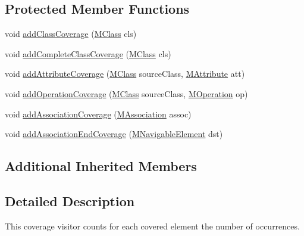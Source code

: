 \subsection*{Protected Member Functions}
\begin{DoxyCompactItemize}
\item 
void \hyperlink{classorg_1_1tzi_1_1use_1_1analysis_1_1coverage_1_1_coverage_calculation_visitor_a76f1d26a8a613f7fad1c69e1c1c86075}{add\-Class\-Coverage} (\hyperlink{interfaceorg_1_1tzi_1_1use_1_1uml_1_1mm_1_1_m_class}{M\-Class} cls)
\item 
void \hyperlink{classorg_1_1tzi_1_1use_1_1analysis_1_1coverage_1_1_coverage_calculation_visitor_a2efd9074033f1efc45ada5f5f00e0fdf}{add\-Complete\-Class\-Coverage} (\hyperlink{interfaceorg_1_1tzi_1_1use_1_1uml_1_1mm_1_1_m_class}{M\-Class} cls)
\item 
void \hyperlink{classorg_1_1tzi_1_1use_1_1analysis_1_1coverage_1_1_coverage_calculation_visitor_aadd4c7269e43524697aec5bedfe91446}{add\-Attribute\-Coverage} (\hyperlink{interfaceorg_1_1tzi_1_1use_1_1uml_1_1mm_1_1_m_class}{M\-Class} source\-Class, \hyperlink{classorg_1_1tzi_1_1use_1_1uml_1_1mm_1_1_m_attribute}{M\-Attribute} att)
\item 
void \hyperlink{classorg_1_1tzi_1_1use_1_1analysis_1_1coverage_1_1_coverage_calculation_visitor_a5e9acf507fc7799c3b76b6c157a69023}{add\-Operation\-Coverage} (\hyperlink{interfaceorg_1_1tzi_1_1use_1_1uml_1_1mm_1_1_m_class}{M\-Class} source\-Class, \hyperlink{classorg_1_1tzi_1_1use_1_1uml_1_1mm_1_1_m_operation}{M\-Operation} op)
\item 
void \hyperlink{classorg_1_1tzi_1_1use_1_1analysis_1_1coverage_1_1_coverage_calculation_visitor_a10ab9cd8204f625936aa09c8072b3408}{add\-Association\-Coverage} (\hyperlink{interfaceorg_1_1tzi_1_1use_1_1uml_1_1mm_1_1_m_association}{M\-Association} assoc)
\item 
void \hyperlink{classorg_1_1tzi_1_1use_1_1analysis_1_1coverage_1_1_coverage_calculation_visitor_addacbc361607ba01c4bff2a8eaed232f}{add\-Association\-End\-Coverage} (\hyperlink{interfaceorg_1_1tzi_1_1use_1_1uml_1_1mm_1_1_m_navigable_element}{M\-Navigable\-Element} dst)
\end{DoxyCompactItemize}
\subsection*{Additional Inherited Members}


\subsection{Detailed Description}
This coverage visitor counts for each covered element the number of occurrences. 

